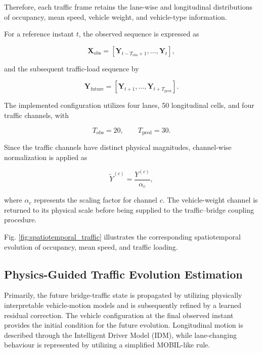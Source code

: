 \documentclass[journal]{IEEEtran}
\begin{document}
Therefore, each traffic frame retains the lane-wise and longitudinal distributions of occupancy, mean speed, vehicle weight, and vehicle-type information.

For a reference instant $t$, the observed sequence is expressed as

\begin{equation}
\mathbf{X}_{\mathrm{obs}}
=
\left[
\mathbf{Y}_{t-T_{\mathrm{obs}}+1},
\ldots,
\mathbf{Y}_{t}
\right],
\label{eq:observed_sequence}
\end{equation}

and the subsequent traffic-load sequence by

\begin{equation}
\mathbf{Y}_{\mathrm{future}}
=
\left[
\mathbf{Y}_{t+1},
\ldots,
\mathbf{Y}_{t+T_{\mathrm{pred}}}
\right].
\label{eq:future_sequence}
\end{equation}

The implemented configuration utilizes four lanes, 50 longitudinal cells, and four traffic channels, with

\begin{equation}
T_{\mathrm{obs}}=20,
\qquad
T_{\mathrm{pred}}=30.
\label{eq:sequence_lengths}
\end{equation}

Since the traffic channels have distinct physical magnitudes, channel-wise normalization is applied as

\begin{equation}
\widetilde{Y}^{(c)}
=
\frac{Y^{(c)}}{\alpha_c},
\label{eq:channel_normalization}
\end{equation}

where $\alpha_c$ represents the scaling factor for channel $c$. The vehicle-weight channel is returned to its physical scale before being supplied to the traffic--bridge coupling procedure.

Fig. \ref{fig:spatiotemporal_traffic} illustrates the corresponding spatiotemporal evolution of occupancy, mean speed, and traffic loading.

\subsection{Physics-Guided Traffic Evolution Estimation}
\label{sec:physics_guided_evolution}

Primarily, the future bridge-traffic state is propagated by utilizing physically interpretable vehicle-motion models and is subsequently refined by a learned residual correction. The vehicle configuration at the final observed instant provides the initial condition for the future evolution. Longitudinal motion is described through the Intelligent Driver Model (IDM), while lane-changing behaviour is represented by utilizing a simplified MOBIL-like rule.
\end{document}
